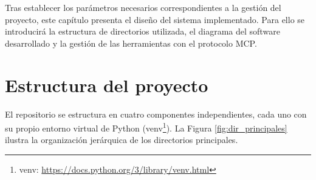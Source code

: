 Tras establecer los parámetros necesarios correspondientes a la gestión del proyecto, este capítulo presenta el diseño del sistema implementado. Para ello se introducirá la estructura de directorios utilizada, el diagrama del software desarrollado y la gestión de las herramientas con el protocolo MCP. 

\section{Estructura del proyecto}
El repositorio se estructura en cuatro componentes independientes, cada uno con su propio entorno virtual de Python (venv\footnote{venv: \url{https://docs.python.org/3/library/venv.html}}). La Figura \ref{fig:dir_principales} ilustra la organización jerárquica de los directorios principales.

